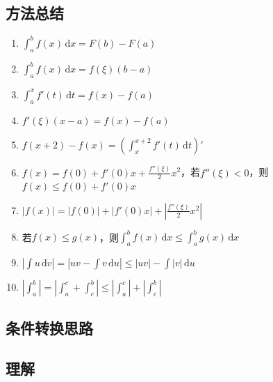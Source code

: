 \documentclass[a4paper,12pt]{article}
\begin{document}
    \subsection{方法总结}

    \begin{enumerate}
        \item $\int_a^b f(x)\,\mathrm{d}x = F(b) - F(a)$
        \item $\int_a^b f(x)\,\mathrm{d}x = f(\xi)(b - a)$
        \item $\int_a^x f'(t)\,\mathrm{d}t = f(x) - f(a)$
        \item $f'(\xi)(x - a) = f(x) - f(a)$
        \item $f(x + 2) - f(x) = (\int_x^{x + 2} f'(t)\,\mathrm{d}t)'$
        \item $f(x) = f(0) + f'(0)x + \displaystyle\frac{f''(\xi)}{2}x^2$，若$f''(\xi) < 0$，则$f(x) \leq f(0) + f'(0)x$
        \item $|f(x)| = |f(0)| + |f'(0)x| + \left|\displaystyle\frac{f''(\xi)}{2}x^2\right|$
        \item 若$f(x) \leq g(x)$，则$\int_a^b f(x)\,\mathrm{d}x \leq \int_a^b g(x)\,\mathrm{d}x$
        \item $|\int u\,\mathrm{d}v| = |uv - \int v\,\mathrm{d}u| \leq |uv| - \int |v|\,\mathrm{d}u$
        \item $|\int_a^b| = |\int_a^c + \int_c^b| \leq |\int_a^c| + |\int_c^b|$
    \end{enumerate}

    \subsection{条件转换思路}

    \begin{enumerate}

    \end{enumerate}

    \subsection{理解}

    \begin{enumerate}
    \end{enumerate}
\end{document}
